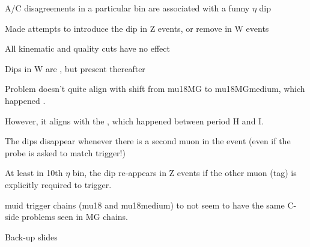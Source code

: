  {
 \iteb
 \item A/C disagreements in a particular bin are associated with a funny $\eta$ dip
 \item Made attempts to introduce the dip in Z events, or remove in W events
 \iteb
 \item All kinematic and quality cuts have no effect
 \item Dips in W are , but present thereafter
 \iteb
 \item Problem doesn't quite align with shift from mu18MG to mu18MGmedium, which happened .
 \item However, it aligns with the , which happened between period H and I.
 \itee
 \item The dips disappear whenever there is a second muon in the event (even if the probe is asked to match trigger!)
 \iteb
 \item At least in 10th $\eta$ bin, the dip re-appears in Z events if the other muon (tag) is explicitly required to  trigger.
 \itee
 \item muid trigger chains (mu18 and mu18medium) to not seem to have the same C-side problems seen in MG chains.
 \itee
 \itee
}


\appendix
{}
\setcounter{finalframe}{\value{framenumber}}

\slide{}
{

\centering
\Huge Back-up slides
}
